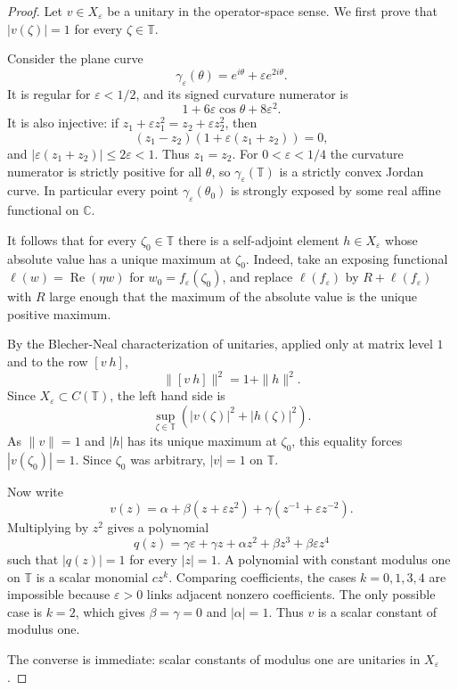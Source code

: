 \documentclass[11pt]{article}
\newcommand{\T}{\mathbb T}
\newcommand{\C}{\mathbb C}
\begin{document}
\begin{proof}
Let \(v\in X_\varepsilon\) be a unitary in the operator-space sense.  We first prove that \(|v(\zeta)|=1\) for every \(\zeta\in\T\).

Consider the plane curve
\[
\gamma_\varepsilon(\theta)=e^{i\theta}+\varepsilon e^{2i\theta}.
\]
It is regular for \(\varepsilon<1/2\), and its signed curvature numerator is
\[
1+6\varepsilon\cos\theta+8\varepsilon^2.
\]
It is also injective: if \(z_1+\varepsilon z_1^2=z_2+\varepsilon z_2^2\), then
\[
(z_1-z_2)(1+\varepsilon(z_1+z_2))=0,
\]
and \(|\varepsilon(z_1+z_2)|\le 2\varepsilon<1\).  Thus \(z_1=z_2\).  For \(0<\varepsilon<1/4\) the curvature numerator is strictly positive for all \(\theta\), so \(\gamma_\varepsilon(\T)\) is a strictly convex Jordan curve.  In particular every point \(\gamma_\varepsilon(\theta_0)\) is strongly exposed by some real affine functional on \(\C\).

It follows that for every \(\zeta_0\in\T\) there is a self-adjoint element \(h\in X_\varepsilon\) whose absolute value has a unique maximum at \(\zeta_0\).  Indeed, take an exposing functional \(\ell(w)=\operatorname{Re}(\eta w)\) for \(w_0=f_\varepsilon(\zeta_0)\), and replace \(\ell(f_\varepsilon)\) by \(R+\ell(f_\varepsilon)\) with \(R\) large enough that the maximum of the absolute value is the unique positive maximum.

By the Blecher-Neal characterization of unitaries, applied only at matrix level \(1\) and to the row \([v\ h]\),
\[
\|[v\ h]\|^2=1+\|h\|^2.
\]
Since \(X_\varepsilon\subset C(\T)\), the left hand side is
\[
\sup_{\zeta\in\T}\left(|v(\zeta)|^2+|h(\zeta)|^2\right).
\]
As \(\|v\|=1\) and \(|h|\) has its unique maximum at \(\zeta_0\), this equality forces \(|v(\zeta_0)|=1\).  Since \(\zeta_0\) was arbitrary, \(|v|=1\) on \(\T\).

Now write
\[
v(z)=\alpha+\beta(z+\varepsilon z^2)+\gamma(z^{-1}+\varepsilon z^{-2}).
\]
Multiplying by \(z^2\) gives a polynomial
\[
q(z)=\gamma\varepsilon+\gamma z+\alpha z^2+\beta z^3+\beta\varepsilon z^4
\]
such that \(|q(z)|=1\) for every \(|z|=1\).  A polynomial with constant modulus one on \(\T\) is a scalar monomial \(c z^k\).  Comparing coefficients, the cases \(k=0,1,3,4\) are impossible because \(\varepsilon>0\) links adjacent nonzero coefficients.  The only possible case is \(k=2\), which gives \(\beta=\gamma=0\) and \(|\alpha|=1\).  Thus \(v\) is a scalar constant of modulus one.

The converse is immediate: scalar constants of modulus one are unitaries in \(X_\varepsilon\).
\end{proof}
\end{document}
